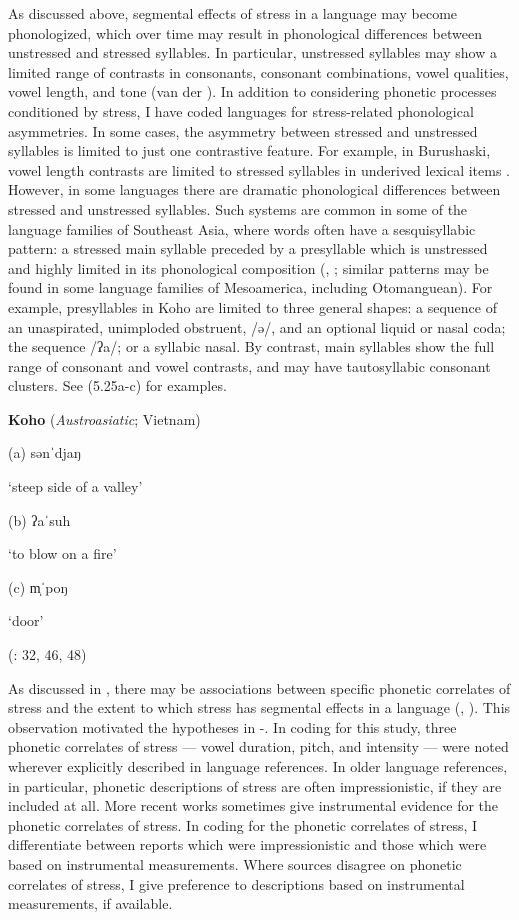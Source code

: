   As discussed above, segmental effects of stress in a language may become phonologized, which over time may result in phonological differences between unstressed and stressed syllables. In particular, unstressed syllables may show a limited range of contrasts in consonants, consonant combinations, vowel qualities, vowel length, and tone (van der \citealt{Hulst2010}). In addition to considering phonetic processes conditioned by stress, I have coded languages for stress-related phonological asymmetries. In some cases, the asymmetry between stressed and unstressed syllables is limited to just one contrastive feature. For example, in Burushaski, vowel length contrasts are limited to stressed syllables in underived lexical items \citep[1028]{Anderson1997}. However, in some languages there are dramatic phonological differences between stressed and unstressed syllables. Such systems are common in some of the language families of Southeast Asia, where words often have a sesquisyllabic pattern: a stressed main syllable preceded by a presyllable which is unstressed and highly limited in its phonological composition (\citealt{Matisoff1973}, \citealt{Michaud2012}; similar patterns may be found in some language families of Mesoamerica, including Otomanguean). For example, presyllables in Koho are limited to three general shapes: a sequence of an unaspirated, unimploded obstruent, /ə/, and an optional liquid or nasal coda; the sequence /ʔa/; or a syllabic nasal. By contrast, main syllables show the full range of consonant and vowel contrasts, and may have tautosyllabic consonant clusters. See (5.25a-c) for examples.

\ea\label{ex:(5.25)}
  \textbf{Koho} (\textit{Austroasiatic}; Vietnam)

(a)  sənˈdjaŋ

\glt ‘steep side of a valley’

(b)  ʔaˈsuh

\glt ‘to blow on a fire’

(c)  m̩ˈpoŋ

\glt ‘door’

(\citealt{Olsen2014}: 32, 46, 48)

\z

  As discussed in , there may be associations between specific phonetic correlates of stress and the extent to which stress has segmental effects in a language (\citealt{BybeeEtAl1998}, \citealt{Schiering2007}). This observation motivated the hypotheses in -. In coding for this study, three phonetic correlates of stress — vowel duration, pitch, and intensity — were noted wherever explicitly described in language references. In older language references, in particular, phonetic descriptions of stress are often impressionistic, if they are included at all. More recent works sometimes give instrumental evidence for the phonetic correlates of stress. In coding for the phonetic correlates of stress, I differentiate between reports which were impressionistic and those which were based on instrumental measurements. Where sources disagree on phonetic correlates of stress, I give preference to descriptions based on instrumental measurements, if available.

